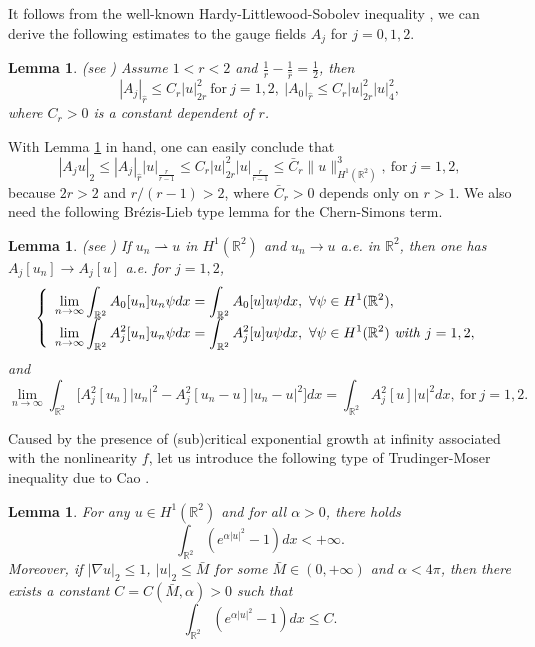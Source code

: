 \documentclass[11pt]{amsart}
\numberwithin{equation}{section}
\newtheorem{lemma}[theorem]{Lemma}
\theoremstyle{definition}
\newcommand{\R}{\mathbb{R}}
\begin{document}
It follows from
 the well-known Hardy-Littlewood-Sobolev inequality \cite[Theorem 4.3]{LM}, we can derive
the following estimates to the gauge fields $A_j$ for $j = 0, 1, 2$.


\begin{lemma}\label{gauge}
(see \cite[Propositions 4.2-4.3]{Huh2}) Assume $1<r<2$ and $\frac{1}{r}
-\frac{1}{\widehat{r}}=\frac{1}{2}$, then
\[
|A_j|_{\widehat{r}}\leq C_r|u|_{2r}^2~ \text{for}~ j=1,2,~
|A_0|_{\widehat{r}}\leq C_r|u|_{2r}^2|u|_4^2,
\]
where $C_r>0$ is a constant dependent of $r$.
\end{lemma}

With Lemma \ref{gauge} in hand, one can easily conclude that
\begin{equation}\label{gauge1}
  |A_ju|_2\leq |A_j|_{\widehat{r}}|u|_{\frac{r}{r-1}}
\leq C_r|u|_{2r}^2|u|_{\frac{r}{r-1}}\leq \bar{C}_r\|u\|_{H^1(\R^2)}^3,
~ \text{for}~ j=1,2,
\end{equation}
because $2r>2$ and $r/(r-1)>2$, where $\bar{C}_r>0$  depends only on  $r>1$.
We also need the following Br\'{e}zis-Lieb type lemma for the Chern-Simons term.
\begin{lemma}\label{BLCS}
(see \cite[Lemma 2.4]{GZ})
If $u_n\rightharpoonup u$ in $H^1(\R^2)$ and $u_n\to u$ a.e. in $\R^2$, then one has
$A_j [u_n]\to A_j[u]$ a.e. for $j=1,2$,
\begin{equation}\label{BLCS1}
 \left\{
   \begin{array}{ll}
  \displaystyle    \lim_{n\to\infty}\int_{\R^2}A_0[u_n]u_n\psi dx=\int_{\R^2}A_0[u ]u \psi dx,~\forall \psi\in H^1(\R^2),\\
   \displaystyle      \lim_{n\to\infty}\int_{\R^2}A_j^2[u_n]u_n\psi dx=\int_{\R^2}A_j^2[u ]u \psi dx,
   ~\forall \psi\in H^1(\R^2)~\text{\emph{with}}~j=1,2,
   \end{array}
 \right.
\end{equation}
 and
\begin{equation}\label{BLCS2}
\lim_{n\to\infty}\int_{\R^2}\big[A_j^2[u_n]|u_n|^2-A_j^2[u_n-u]|u_n-u|^2\big]dx
=\int_{\R^2}A_j^2[u]|u|^2dx,~\text{for}~j=1,2.
\end{equation}
\end{lemma}

Caused by the presence of (sub)critical exponential growth at infinity associated with the nonlinearity $f$,
  let us introduce the following type of Trudinger-Moser inequality due to Cao \cite{Cao}.
\begin{lemma}\label{TM}
For any $u\in H^1(\R^2)$ and for all $\alpha>0$, there holds
 \begin{equation}\label{TM1}
 \int_{\R^2}(e^{\alpha|u|^2}-1)dx<+\infty.
 \end{equation}
Moreover, if
$|\nabla u|_2\leq 1$, $|u|_2\leq \bar{M}$ for some $\bar{M}\in(0,+\infty)$ and $\alpha<4\pi$, then there exists a constant $C=C(\bar{M},\alpha)>0$ such that
\begin{equation}\label{TM2}
\int_{\R^2}(e^{\alpha|u|^2}-1)dx\leq C.
\end{equation}
\end{lemma}
\end{document}
